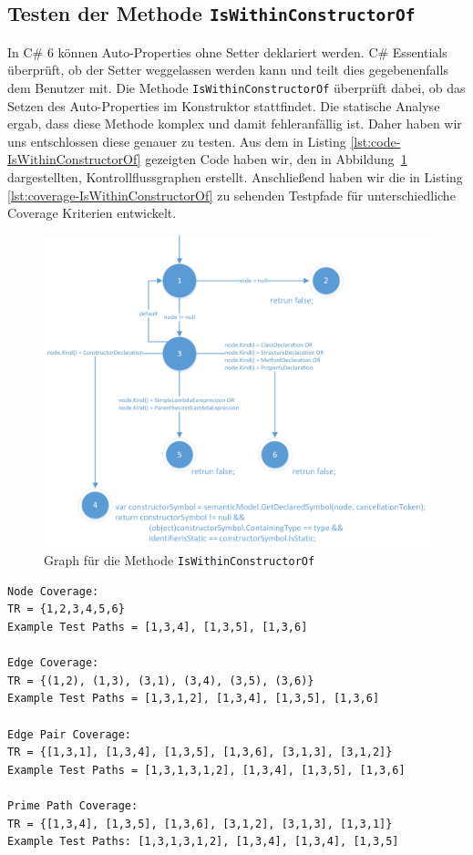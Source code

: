 \subsection{Testen der Methode \texttt{IsWithinConstructorOf}}
In C\# 6 können Auto-Properties ohne Setter deklariert werden.\cite{csharp6} C\# Essentials überprüft, ob der Setter weggelassen werden kann und teilt dies gegebenenfalls dem Benutzer mit. Die Methode \texttt{IsWithinConstructorOf} überprüft dabei, ob das Setzen des Auto-Properties im Konstruktor stattfindet. Die statische Analyse ergab, dass diese Methode komplex und damit fehleranfällig ist. Daher haben wir uns entschlossen diese genauer zu testen. Aus dem in Listing \ref{lst:code-IsWithinConstructorOf} gezeigten Code haben wir, den in Abbildung~\ref{fig:graph-constructor} dargestellten, Kontrollflussgraphen erstellt. Anschließend haben wir die in Listing \ref{lst:coverage-IsWithinConstructorOf} zu sehenden Testpfade für unterschiedliche Coverage Kriterien entwickelt.\\
\begin{figure}[h]
	\centering
	\includegraphics[width=\textwidth]{images/GraphIsWithinConstructorOf.png}
	\caption{Graph für die Methode \texttt{IsWithinConstructorOf}}
	\label{fig:graph-constructor}
\end{figure}
\begin{lstlisting}[caption={Coverage für die Methode \texttt{IsWithinConstructorOf}},
label=lst:coverage-IsWithinConstructorOf]
Node Coverage:
TR = {1,2,3,4,5,6}
Example Test Paths = [1,3,4], [1,3,5], [1,3,6]

Edge Coverage:
TR = {(1,2), (1,3), (3,1), (3,4), (3,5), (3,6)}
Example Test Paths = [1,3,1,2], [1,3,4], [1,3,5], [1,3,6]

Edge Pair Coverage:
TR = {[1,3,1], [1,3,4], [1,3,5], [1,3,6], [3,1,3], [3,1,2]}
Example Test Paths = [1,3,1,3,1,2], [1,3,4], [1,3,5], [1,3,6]

Prime Path Coverage:
TR = {[1,3,4], [1,3,5], [1,3,6], [3,1,2], [3,1,3], [1,3,1]}
Example Test Paths: [1,3,1,3,1,2], [1,3,4], [1,3,4], [1,3,5]
\end{lstlisting}
